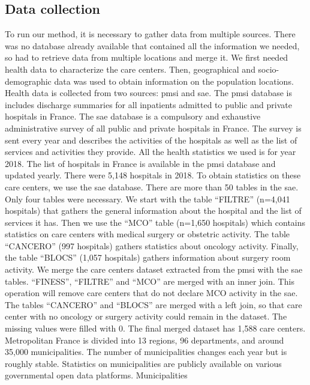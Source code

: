 \subsection{Data collection}

To run our method, it is necessary to gather data from multiple sources. There
was no database already available that contained all the information we needed,
so had to retrieve data from multiple locations and merge it. We first needed
health data to characterize the care centers. Then, geographical and
socio-demographic data was used to obtain information on the population
locations. Health data is collected from two sources: \ac{pmsi} and \ac{sae}.
The \ac{pmsi} database is includes discharge summaries for all inpatients
admitted to public and private hospitals in France. The \ac{sae} database is a
compulsory and exhaustive administrative survey of all public and private
hospitals in France. The survey is sent every year and describes the activities
of the hospitals as well as the list of services and activities they provide.
All the health statistics we used is for year 2018. The list of hospitals in
France is available in the \ac{pmsi} database and updated yearly. There were
5,148 hospitals in 2018. To obtain statistics on these care centers, we use the
\ac{sae} database. There are more than 50 tables in the \ac{sae}. Only four
tables were necessary. We start with the table ``FILTRE'' (n=4,041 hospitals)
that gathers the general information about the hospital and the list of services
it has. Then we use the ``MCO'' table (n=1,650 hospitals) which contains
statistics on care centers with medical surgery or obstetric activity. The table
``CANCERO'' (997 hospitals) gathers statistics about oncology activity. Finally,
the table ``BLOCS'' (1,057 hospitals) gathers information about surgery room
activity. We merge the care centers dataset extracted from the \ac{pmsi} with
the \ac{sae} tables. ``FINESS'', ``FILTRE'' and ``MCO'' are merged with an inner
join. This operation will remove care centers that do not declare MCO activity
in the \ac{sae}. The tables ``CANCERO'' and ``BLOCS'' are merged with a left
join, so that care center with no oncology or surgery activity could remain in
the dataset. The missing values were filled with 0. The final merged dataset has
1,588 care centers. Metropolitan France is divided into 13 regions, 96
departments, and around 35,000 municipalities. The number of municipalities
changes each year but is roughly stable. Statistics on municipalities are
publicly available on various governmental open data platforms. Municipalities
